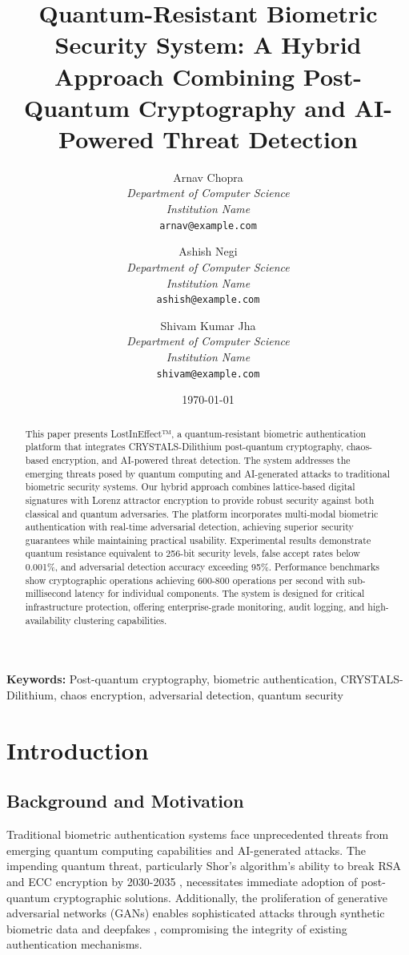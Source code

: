 \documentclass[12pt,a4paper]{article}
\title{Quantum-Resistant Biometric Security System: A Hybrid Approach Combining Post-Quantum Cryptography and AI-Powered Threat Detection}
\author{
Arnav Chopra \\
\textit{Department of Computer Science} \\
\textit{Institution Name} \\
\texttt{arnav@example.com}
\and
Ashish Negi \\
\textit{Department of Computer Science} \\
\textit{Institution Name} \\
\texttt{ashish@example.com}
\and
Shivam Kumar Jha \\
\textit{Department of Computer Science} \\
\textit{Institution Name} \\
\texttt{shivam@example.com}
}
\date{\today}
\begin{document}
\maketitle

\begin{abstract}
This paper presents LostInEffect™, a quantum-resistant biometric authentication platform that integrates CRYSTALS-Dilithium post-quantum cryptography, chaos-based encryption, and AI-powered threat detection. The system addresses the emerging threats posed by quantum computing and AI-generated attacks to traditional biometric security systems. Our hybrid approach combines lattice-based digital signatures with Lorenz attractor encryption to provide robust security against both classical and quantum adversaries. The platform incorporates multi-modal biometric authentication with real-time adversarial detection, achieving superior security guarantees while maintaining practical usability. Experimental results demonstrate quantum resistance equivalent to 256-bit security levels, false accept rates below 0.001\%, and adversarial detection accuracy exceeding 95\%. Performance benchmarks show cryptographic operations achieving 600-800 operations per second with sub-millisecond latency for individual components. The system is designed for critical infrastructure protection, offering enterprise-grade monitoring, audit logging, and high-availability clustering capabilities.
\end{abstract}

\textbf{Keywords:} Post-quantum cryptography, biometric authentication, CRYSTALS-Dilithium, chaos encryption, adversarial detection, quantum security

\section{Introduction}

\subsection{Background and Motivation}

Traditional biometric authentication systems face unprecedented threats from emerging quantum computing capabilities and AI-generated attacks. The impending quantum threat, particularly Shor's algorithm's ability to break RSA and ECC encryption by 2030-2035 \cite{shor1994algorithms, mosca2018cybersecurity}, necessitates immediate adoption of post-quantum cryptographic solutions. Additionally, the proliferation of generative adversarial networks (GANs) enables sophisticated attacks through synthetic biometric data and deepfakes \cite{goodfellow2014generative, karras2019style}, compromising the integrity of existing authentication mechanisms.
\end{document}

